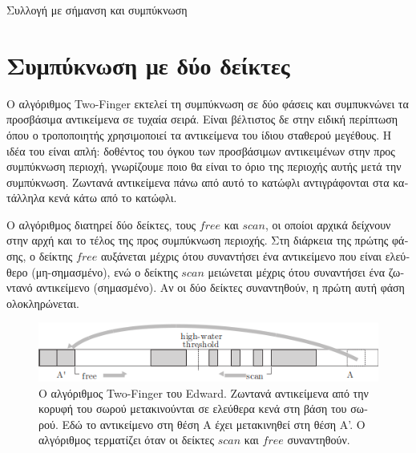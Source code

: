 \begin{greek}
\begin{algorithm}
  \caption{Συλλογή με σήμανση και συμπύκνωση}
  \label{alg:mrkcmp}
  \begin{algorithmic}[1]
    \State {}
    \State {}
  \end{algorithmic}
\end{algorithm}

\section{Συμπύκνωση με δύο δείκτες}
Ο αλγόριθμος Two-Finger \cite{saunders1964lisp} εκτελεί τη συμπύκνωση σε δύο φάσεις και 
συμπυκνώνει τα προσβάσιμα αντικείμενα σε τυχαία σειρά. Είναι βέλτιστος δε στην ειδική 
περίπτωση όπου ο τροποποιητής χρησιμοποιεί τα αντικείμενα του ίδιου σταθερού μεγέθους. 
Η ιδέα του είναι απλή: δοθέντος του όγκου των προσβάσιμων αντικειμένων στην προς συμπύκνωση 
περιοχή, γνωρίζουμε ποιο θα είναι το όριο της περιοχής αυτής μετά την συμπύκνωση. Ζωντανά 
αντικείμενα πάνω από αυτό το κατώφλι αντιγράφονται στα κατάλληλα κενά κάτω  από το κατώφλι.

Ο αλγόριθμος διατηρεί δύο δείκτες, τους $free$ και $scan$, οι οποίοι αρχικά δείχνουν στην 
αρχή και το τέλος της προς συμπύκνωση περιοχής. Στη διάρκεια της πρώτης φάσης, ο δείκτης 
$free$ αυξάνεται μέχρις ότου συναντήσει ένα αντικείμενο που είναι ελεύθερο (μη-σημασμένο), 
ενώ ο δείκτης $scan$ μειώνεται μέχρις ότου συναντήσει ένα ζωντανό αντικείμενο (σημασμένο). 
Αν οι δύο δείκτες συναντηθούν, η πρώτη αυτή φάση ολοκληρώνεται. 

\begin{figure}[H]
  \centering
  \includegraphics{figures/mrkcmp_1}
  \caption[Ο αλγόριθμος Two-Finger του Edward]
    {Ο αλγόριθμος Two-Finger του Edward. Ζωντανά αντικείμενα
     από την κορυφή του σωρού μετακινούνται σε ελεύθερα κενά
     στη βάση του σωρού. Εδώ το αντικείμενο στη θέση Α έχει
     μετακινηθεί στη θέση Α'. Ο αλγόριθμος τερματίζει όταν
     οι δείκτες $scan$ και $free$ συναντηθούν.}
  \label{fig:mrkcmp_1}
\end{figure}


\end{greek}
